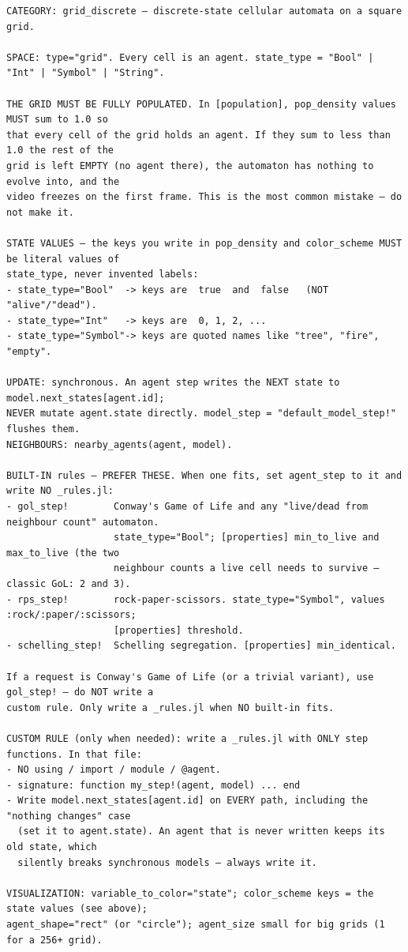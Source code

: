 \begin{lstlisting}[style=cellprompt]
CATEGORY: grid_discrete — discrete-state cellular automata on a square grid.

SPACE: type="grid". Every cell is an agent. state_type = "Bool" | "Int" | "Symbol" | "String".

THE GRID MUST BE FULLY POPULATED. In [population], pop_density values MUST sum to 1.0 so
that every cell of the grid holds an agent. If they sum to less than 1.0 the rest of the
grid is left EMPTY (no agent there), the automaton has nothing to evolve into, and the
video freezes on the first frame. This is the most common mistake — do not make it.

STATE VALUES — the keys you write in pop_density and color_scheme MUST be literal values of
state_type, never invented labels:
- state_type="Bool"  -> keys are  true  and  false   (NOT "alive"/"dead").
- state_type="Int"   -> keys are  0, 1, 2, ...
- state_type="Symbol"-> keys are quoted names like "tree", "fire", "empty".

UPDATE: synchronous. An agent step writes the NEXT state to model.next_states[agent.id];
NEVER mutate agent.state directly. model_step = "default_model_step!" flushes them.
NEIGHBOURS: nearby_agents(agent, model).

BUILT-IN rules — PREFER THESE. When one fits, set agent_step to it and write NO _rules.jl:
- gol_step!        Conway's Game of Life and any "live/dead from neighbour count" automaton.
                   state_type="Bool"; [properties] min_to_live and max_to_live (the two
                   neighbour counts a live cell needs to survive — classic GoL: 2 and 3).
- rps_step!        rock-paper-scissors. state_type="Symbol", values :rock/:paper/:scissors;
                   [properties] threshold.
- schelling_step!  Schelling segregation. [properties] min_identical.

If a request is Conway's Game of Life (or a trivial variant), use gol_step! — do NOT write a
custom rule. Only write a _rules.jl when NO built-in fits.

CUSTOM RULE (only when needed): write a _rules.jl with ONLY step functions. In that file:
- NO using / import / module / @agent.
- signature: function my_step!(agent, model) ... end
- Write model.next_states[agent.id] on EVERY path, including the "nothing changes" case
  (set it to agent.state). An agent that is never written keeps its old state, which
  silently breaks synchronous models — always write it.

VISUALIZATION: variable_to_color="state"; color_scheme keys = the state values (see above);
agent_shape="rect" (or "circle"); agent_size small for big grids (1 for a 256+ grid).


\end{lstlisting}
